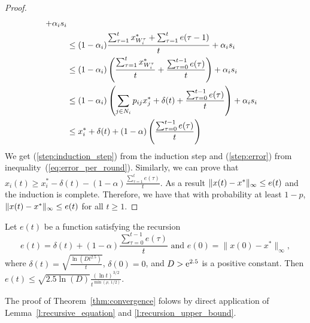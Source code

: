 \begin{proof}
\begin{align}
    + \alpha_i s_i \nonumber \\
    &\leq
    (1-\alpha_i)\frac{\sum_{\tau=1}^{t}x^*_{W_i^{\tau}} +
      \sum_{\tau=1}^{t} e(\tau-1)}{t} + \alpha_i s_i \label{step:induction_step}\\
    &\leq
    (1-\alpha_i)
    \left(
    \frac{\sum_{\tau=1}^{t}x^*_{W_i^{\tau}}}{t}+
    \frac{\sum_{\tau=0}^{t-1} e(\tau)}{t}
    \right)
    + \alpha_i s_i \nonumber\\
    &\leq
    (1-\alpha_i)\left(\sum_{j \in N_i} p_{ij} x^*_{j} +
    \delta(t) + \frac{\sum_{\tau=0}^{t-1} e(\tau)}{t} \right) +
    \alpha_i s_i \label{step:error} \\
    &\leq
    x_i^* + \delta(t) + (1-\alpha)
    \left(
    \frac{\sum_{\tau=0}^{t-1} e(\tau)}{t}
    \right)
    \nonumber
  \end{align}
  We get (\ref{step:induction_step}) from the induction step and
  (\ref{step:error}) from inequality~(\ref{eq:error_per_round}).
  Similarly, we can prove that
  $x_i(t) \geq x_i^* - \delta(t) - (1-\alpha)
  \frac{\sum_{\tau=1}^t e(\tau)}{t}$.
  As a result $\| x(t)-x^* \|_{\infty} \leq e(t)$ and the induction
  is complete.  Therefore, we have that with probability at least $1-p$,
  \(\| x(t) - x^* \|_{\infty} \leq e(t)\) for all $t\geq 1$.
\end{proof}

\begin{lemma}\label{l:recursion_upper_bound}
  Let $e(t)$ be a function satisfying the recursion
  \[
    e(t) =
    \delta(t) + (1-\alpha)\frac{\sum_{\tau=0}^{t-1}e(\tau)}{t}
    \text{ and } e(0)=\|x(0) - x^*\|_{\infty},
  \]
  where \(\delta(t) = \sqrt{\frac{\ln(D t^{2.5})}{t}} \), \(\delta(0) = 0 \),
  and $D > \mathrm{e}^{2.5}$ is a positive constant.  Then
  \(
    e(t) \leq
    \sqrt{2.5 \ln(D)} \frac{(\ln t)^{3/2}}{t^{\min(\rho,\, 1/2)}}.
  \)
\end{lemma}
\noindent The proof of Theorem~\ref{thm:convergence} folows by direct 
application of Lemma~\ref{l:recursive_equation} and \ref{l:recursion_upper_bound}. 